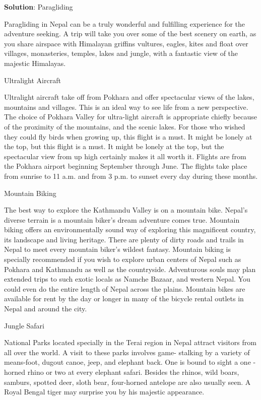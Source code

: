 \documentclass[
]{book}
\newenvironment{solution}{ {\bfseries Solution}:}{}
\begin{document}
\begin{questions}
\begin{solution}
Paragliding

Paragliding in Nepal can be a truly wonderful and fulfilling experience for the adventure seeking. A trip will take you over some of the best scenery on earth, as you share airspace with Himalayan griffins vultures, eagles, kites and float over villages, monasteries, temples, lakes and jungle, with a fantastic view of the majestic Himalayas.

Ultralight Aircraft

Ultralight aircraft take off from Pokhara and offer spectacular views of the lakes, mountains and villages. This is an ideal way to see life from a new perspective. The choice of Pokhara Valley for ultra-light aircraft is appropriate chiefly because of the proximity of the mountains, and the scenic lakes. For those who wished they could fly birds when growing up, this flight is a must. It might be lonely at the top, but this flight is a must. It might be lonely at the top, but the spectacular view from up high certainly makes it all worth it. Flights are from the Pokhara airport beginning September through June. The flights take place from sunrise to 11 a.m. and from 3 p.m. to sunset every day during these months.

Mountain Biking

The best way to explore the Kathmandu Valley is on a mountain bike. Nepal’s diverse terrain is a mountain biker’s dream adventure comes true. Mountain biking offers an environmentally sound way of exploring this magnificent country, its landscape and living heritage. There are plenty of dirty roads and trails in Nepal to meet every mountain biker’s wildest fantasy. Mountain biking is specially recommended if you wish to explore urban centers of Nepal such as Pokhara and Kathmandu as well as the countryside. Adventurous souls may plan extended trips to such exotic locals as Namche Bazaar, and western Nepal. You could even do the entire length of Nepal across the plains. Mountain bikes are available for rent by the day or longer in many of the bicycle rental outlets in Nepal and around the city.

Jungle Safari

National Parks located specially in the Terai region in Nepal attract visitors from all over the world. A visit to these parks involves game- stalking by a variety of means-foot, dugout canoe, jeep, and elephant back. One is bound to sight a one - horned rhino or two at every elephant safari. Besides the rhinos, wild boars, samburs, spotted deer, sloth bear, four-horned antelope are also usually seen. A Royal Bengal tiger may surprise you by his majestic appearance.


\end{solution}
\end{questions}
\end{document}
